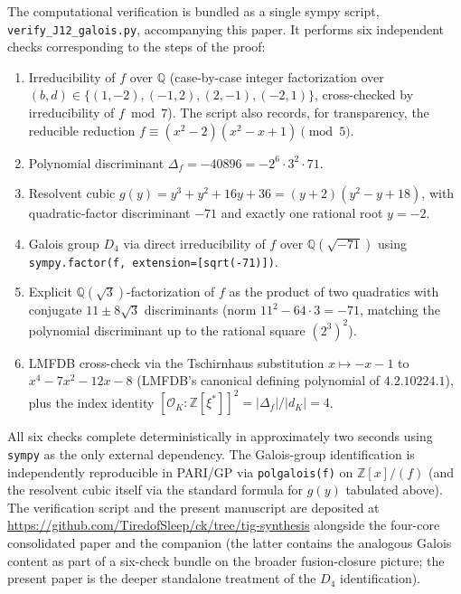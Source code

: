 \documentclass[11pt,reqno]{amsart}
\theoremstyle{plain}
\theoremstyle{definition}
\theoremstyle{remark}
\newcommand{\Q}{\mathbb{Q}}
\newcommand{\Z}{\mathbb{Z}}
\begin{document}
The computational verification is bundled as a single sympy script,
\texttt{verify\_J12\_galois.py}, accompanying this paper. It performs
six independent checks corresponding to the steps of the proof:
\begin{enumerate}\setlength\itemsep{0pt}
\item Irreducibility of $f$ over $\Q$ (case-by-case integer
  factorization over $(b, d) \in \{(1,-2), (-1,2), (2,-1), (-2,1)\}$,
  cross-checked by irreducibility of $f \bmod 7$). The script also
  records, for transparency, the reducible reduction
  $f \equiv (x^{2} - 2)(x^{2} - x + 1) \pmod 5$.
\item Polynomial discriminant $\Delta_{f} = -40896 = -2^{6}\cdot 3^{2}
  \cdot 71$.
\item Resolvent cubic $g(y) = y^{3} + y^{2} + 16y + 36 = (y+2)
  (y^{2} - y + 18)$, with quadratic-factor discriminant $-71$ and
  exactly one rational root $y = -2$.
\item Galois group $D_{4}$ via direct irreducibility of $f$ over
  $\Q(\sqrt{-71})$ using \texttt{sympy.factor(f, extension=[sqrt(-71)])}.
\item Explicit $\Q(\sqrt{3})$-factorization of $f$ as the product of
  two quadratics with conjugate $11 \pm 8\sqrt{3}$ discriminants
  (norm $11^{2} - 64\cdot 3 = -71$, matching the polynomial
  discriminant up to the rational square $(2^{3})^{2}$).
\item LMFDB cross-check via the Tschirnhaus substitution
  $x \mapsto -x - 1$ to $x^{4} - 7x^{2} - 12x - 8$ (LMFDB's canonical
  defining polynomial of $4.2.10224.1$), plus the index identity
  $[\mathcal{O}_{K} : \Z[\xi^{*}]]^{2} = |\Delta_{f}|/|d_{K}| = 4$.
\end{enumerate}

All six checks complete deterministically in approximately two seconds
using \texttt{sympy} as the only external dependency. The Galois-group
identification is independently reproducible in PARI/GP via
\texttt{polgalois(f)} on $\Z[x]/(f)$ (and the resolvent cubic itself
via the standard formula for $g(y)$ tabulated above). The verification
script and the present manuscript are deposited at
\url{https://github.com/TiredofSleep/ck/tree/tig-synthesis} alongside
the four-core consolidated paper \cite{SandersGishFourCore} and the
companion \cite{SandersGishFourCoreJalg} (the latter contains the
analogous Galois content as part of a six-check bundle on the broader
fusion-closure picture; the present paper is the deeper standalone
treatment of the $D_{4}$ identification).
\end{document}
